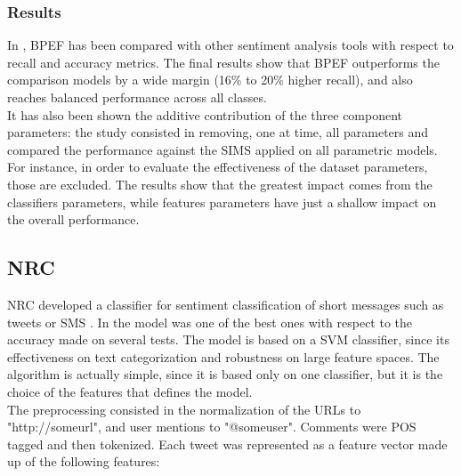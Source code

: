 \subsubsection{Results}

In \cite{Hassan2013TwitterSA}, \ac{BPEF} has been compared with other sentiment analysis tools with respect to recall and accuracy metrics. The final results show that \ac{BPEF} outperforms the comparison models by a wide margin (16\% to 20\% higher recall), and also reaches balanced performance across all classes.\\
It has also been shown the additive contribution of the three component parameters: the study consisted in removing, one at time, all parameters and compared the performance against the SIMS applied on all parametric models. For instance, in order to evaluate the effectiveness of the dataset parameters, those are excluded. The results show that the greatest impact comes from the classifiers parameters, while features parameters have just a shallow impact on the overall performance.

\subsection{NRC}

\ac{NRC} developed a classifier for sentiment classification of short messages such as tweets or SMS \cite{DBLP:journals/corr/MohammadKZ13}. In \cite{Zimbra:2018:STS:3210372.3185045} the model was one of the best ones with respect to the accuracy made on several tests. The model is based on a \ac{SVM} classifier, since its effectiveness on text categorization and robustness on large feature spaces. The algorithm is actually simple, since it is based only on one classifier, but it is the choice of the features that defines the model.\\
The preprocessing consisted in the normalization of the URLs to "http://someurl", and user mentions to "@someuser". Comments were \ac{POS} tagged and then tokenized. Each tweet was represented as a feature vector made up of the following features:

